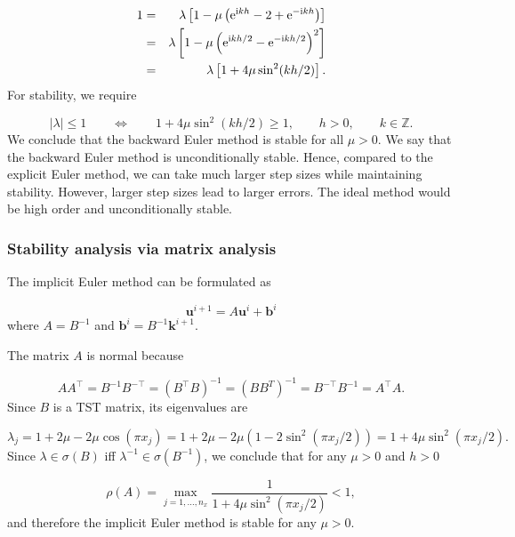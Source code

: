 \documentclass[12pt,landscape]{article}
\begin{document}
{\begin{eqnarray*}
1 &=& \lambda\left[1 - \mu\left({\rm e}^{{\rm i}kh} - 2 + {\rm e}^{-{\rm i}kh} \right)\right] \\
&=& \lambda\left[1 - \mu\left({\rm e}^{{\rm i}kh/2} - {\rm e}^{-{\rm i}kh/2} \right)^2\right] \\
&=& \lambda\left[1 + 4\mu\sin^2(kh/2)\right].
\end{eqnarray*}
For stability, we require

\[
\vert \lambda \vert \leq 1 \qquad \Leftrightarrow \qquad 1 + 4\mu\sin^2(kh/2) \geq 1, \qquad h>0, \qquad k \in \mathbb{Z}.
\]
We conclude that the backward Euler method is stable for all $\mu > 0$.  We say that the backward Euler method is unconditionally stable.  Hence, compared to the explicit Euler method, we can take much larger step sizes while maintaining stability.   However, larger step sizes lead to larger errors.   The ideal method would be high order and unconditionally stable.

\subsubsection{Stability analysis via matrix analysis}
The implicit Euler method can be formulated as

\[
\mathbf{u}^{i+1} = A\mathbf{u}^i + \mathbf{b}^i
\]
where $A = B^{-1}$ and $\mathbf{b}^i = B^{-1}\mathbf{k}^{i+1}$.  

The matrix $A$ is normal because

\[
AA^{\top} = B^{-1}B^{-\top} = \left(B^{\top}B  \right)^{-1} = \left(B B^T  \right)^{-1} = B^{-\top}B^{-1} = A^{\top}A.
\]
Since $B$ is a TST matrix, its eigenvalues are

\[
\lambda_j = 1 + 2\mu - 2\mu\cos\left(\pi x_j  \right) = 1 + 2\mu -2\mu(1 - 2\sin^2(\pi x_j/2)) = 1 + 4\mu\sin^2(\pi x_j/2).
\]
Since $\lambda \in \sigma(B)$ iff $\lambda^{-1} \in \sigma(B^{-1})$, we conclude that for any $\mu > 0$ and $h > 0$ 

\[
\rho(A) = \max_{j = 1, \ldots, n_x} \frac{1}{1 + 4\mu \sin^2(\pi x_j/2)} < 1, 
\]
and therefore the implicit Euler method is stable for any $\mu > 0$.


}
\end{document}
